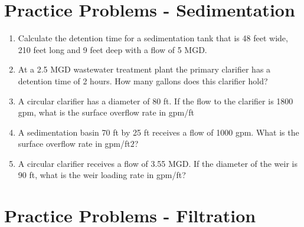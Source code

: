 \section*{Practice Problems - Sedimentation}


\begin{enumerate}

\item Calculate the detention time for a sedimentation tank that is 48 feet wide, 210 feet long and 9 feet deep with a flow of 5 MGD.\\

\item  At a 2.5 MGD wastewater treatment plant the primary clarifier has a detention time of 2 hours. How many gallons does this clarifier hold?\\

\item A circular clarifier has a diameter of 80 ft. If the flow to the clarifier is 1800 gpm, what is the surface overflow rate in gpm/ft

\item A sedimentation basin 70 ft by 25 ft receives a flow of 1000 gpm. What is the surface overflow rate in gpm/ft$2$?


\item A circular clarifier receives a flow of 3.55 MGD. If the diameter of the weir is 90 ft, what is the weir loading rate in gpm/ft?
\end{enumerate}


\section*{Practice Problems - Filtration}

